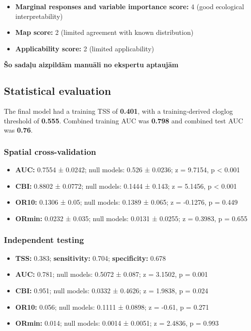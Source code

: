 \documentclass[
  openany]{book}
\providecommand{\tightlist}{%
  \setlength{\itemsep}{0pt}\setlength{\parskip}{0pt}}
\providecommand{\tightlist}{%
  \setlength{\itemsep}{0pt}%
  \setlength{\parskip}{0pt}%
}
\begin{document}
\begin{itemize}
\tightlist
\item
  \textbf{Marginal responses and variable importance score:} 4 (good ecological interpretability)
\item
  \textbf{Map score:} 2 (limited agreement with known distribution)
\item
  \textbf{Applicability score:} 2 (limited applicability)
\end{itemize}

\textbf{Šo sadaļu aizpildām manuāli no ekspertu aptaujām}

\subsection*{Statistical evaluation}\label{statistical-evaluation}

The final model had a training TSS of \textbf{0.401}, with a training-derived cloglog threshold of \textbf{0.555}. Combined training AUC was \textbf{0.798} and combined test AUC was \textbf{0.76}.

\subsubsection*{Spatial cross-validation}\label{spatial-cross-validation}

\begin{itemize}
\tightlist
\item
  \textbf{AUC:} 0.7554 ± 0.0242; null models: 0.526 ± 0.0236; z = 9.7154, p \textless{} 0.001
\item
  \textbf{CBI:} 0.8802 ± 0.0772; null models: 0.1444 ± 0.143; z = 5.1456, p \textless{} 0.001
\item
  \textbf{OR10:} 0.1306 ± 0.05; null models: 0.1389 ± 0.065; z = -0.1276, p = 0.449
\item
  \textbf{ORmin:} 0.0232 ± 0.035; null models: 0.0131 ± 0.0255; z = 0.3983, p = 0.655
\end{itemize}

\subsubsection*{Independent testing}\label{independent-testing}

\begin{itemize}
\tightlist
\item
  \textbf{TSS:} 0.383; \textbf{sensitivity:} 0.704; \textbf{specificity:} 0.678
\item
  \textbf{AUC:} 0.781; null models: 0.5072 ± 0.087; z = 3.1502, p = 0.001
\item
  \textbf{CBI:} 0.951; null models: 0.0332 ± 0.4626; z = 1.9838, p = 0.024
\item
  \textbf{OR10:} 0.056; null models: 0.1111 ± 0.0898; z = -0.61, p = 0.271
\item
  \textbf{ORmin:} 0.014; null models: 0.0014 ± 0.0051; z = 2.4836, p = 0.993
\end{itemize}
\end{document}
